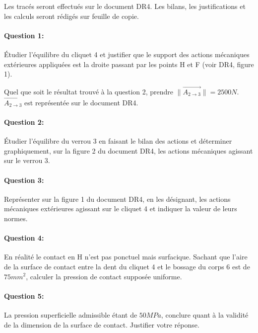 Les tracés seront effectués sur le document DR4. Les bilans, les justifications et les calculs seront rédigés sur feuille de copie. 

\paragraph{Question 1:} Étudier l'équilibre du cliquet 4 et justifier que le support des actions mécaniques extérieures appliquées est la droite passant par les points H et F (voir DR4, figure 1). 

Quel que soit le résultat trouvé à la question 2, prendre $\|\overrightarrow{A_{2 \rightarrow 3}}\|= 2500 N$. $\overrightarrow{A_{2 \rightarrow 3}}$ est représentée sur le document DR4. 

\paragraph{Question 2:} Étudier l'équilibre du verrou 3 en faisant le bilan des actions et déterminer graphiquement, sur la figure 2 du document DR4, les actions mécaniques agissant sur le verrou 3.  

\paragraph{Question 3:} Représenter sur la figure 1 du document DR4, en les désignant, les actions mécaniques extérieures agissant sur le cliquet 4 et indiquer la valeur de leurs normes. 

\paragraph{Question 4:} En réalité le contact en H n'est pas ponctuel mais surfacique. Sachant que l'aire de la surface de contact entre la dent du cliquet 4 et le bossage du corps 6 est de $75 mm^2$, calculer la pression de contact supposée uniforme.

\paragraph{Question 5:} La pression superficielle admissible étant de $50 MPa$, conclure quant à la validité de la dimension de la surface de contact. Justifier votre réponse. 





\ifdef{\public}{}{}

